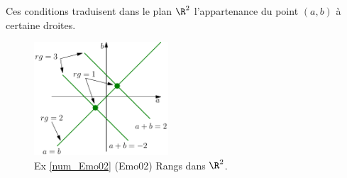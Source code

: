 Ces conditions traduisent dans le plan $\R^2$ l'appartenance du point $(a,b)$ à certaine droites.
\begin{figure}[h!]
  \centering
  \includegraphics[width=5cm]{Cmo02_1.pdf}
  \caption{Ex \ref{num_Emo02} (Emo02) Rangs dans $\R^2$.}
\end{figure}

